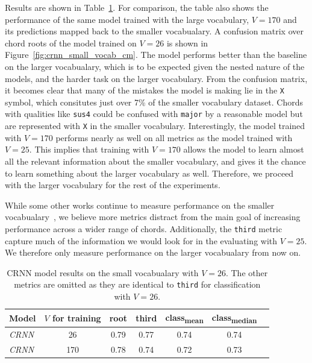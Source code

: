 Results are shown in Table~\ref{tab:crnn_small_vocab}. For comparison, the table also shows the performance of the same model trained with the large vocabulary, $V=170$ and its predictions mapped back to the smaller vocabualary. A confusion matrix over chord roots of the model trained on $V=26$ is shown in Figure~\ref{fig:crnn_small_vocab_cm}. The model performs better than the baseline on the larger vocabualary, which is to be expected given the nested nature of the models, and the harder task on the larger vocabulary. From the confusion matrix, it becomes clear that many of the mistakes the model is making lie in the \texttt{X} symbol, which consitutes just over 7\% of the smaller vocabulary dataset. Chords with qualities like \texttt{sus4} could be confused with \texttt{major} by a reasonable model but are represented with \texttt{X} in the smaller vocabulary. Interestingly, the model trained with $V=170$ performs nearly as well on all metrics as the model trained with $V=25$. This implies that training with $V=170$ allows the model to learn almost all the relevant information about the smaller vocabulary, and gives it the chance to learn something about the larger vocabulary as well. Therefore, we proceed with the larger vocabulary for the rest of the experiments.

While some other works continue to measure performance on the smaller vocabualary~\citep{BTC}, we believe more metrics distract from the main goal of increasing performance across a wider range of chords. Additionally, the \texttt{third} metric capture much of the information we would look for in the evaluating with $V=25$. We therefore only measure performance on the larger vocabualary from now on.

\begin{table}[h]
    \centering
    \begin{tabular}{lcccccc}
        \toprule
        Model & $V$ for training & root & third & class\textsubscript{mean} & class\textsubscript{median} \\  
        \midrule
        \emph{CRNN} & 26 & 0.79 & 0.77 & 0.74 & 0.74 \\
        \emph{CRNN} & 170 & 0.78 & 0.74 & 0.72 & 0.73 \\
        \bottomrule
    \end{tabular}
    \caption{CRNN model results on the small vocabualary with $V=26$. The other metrics are omitted as they are identical to \texttt{third} for classification with $V=26$.}\label{tab:crnn_small_vocab}
\end{table}

